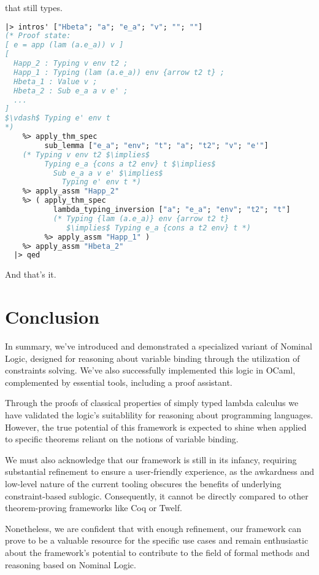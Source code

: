 \documentclass[english, mgr]{iithesis}
\newcommand{\lstt}[1]{\text{{\lstinline[columns=fixed,mathescape]|#1|}}}
\begin{document}
that \lstt{e'} still types.
\begin{lstlisting}[mathescape,language=OCaml,escapebegin=\color{codegreen}]
  |> intros' ["Hbeta"; "a"; "e_a"; "v"; ""; ""]
(* Proof state:
[ e = app (lam (a.e_a)) v ]
[
  Happ_2 : Typing v env t2 ;
  Happ_1 : Typing (lam (a.e_a)) env {arrow t2 t} ;
  Hbeta_1 : Value v ;
  Hbeta_2 : Sub e_a a v e' ;
  ...
]
$\vdash$ Typing e' env t
*)
    %> apply_thm_spec
         sub_lemma ["e_a"; "env"; "t"; "a"; "t2"; "v"; "e'"]
    (* Typing v env t2 $\implies$
         Typing e_a {cons a t2 env} t $\implies$
           Sub e_a a v e' $\implies$
             Typing e' env t *)
    %> apply_assm "Happ_2"
    %> ( apply_thm_spec
           lambda_typing_inversion ["a"; "e_a"; "env"; "t2"; "t"]
           (* Typing {lam (a.e_a)} env {arrow t2 t}
              $\implies$ Typing e_a {cons a t2 env} t *)
         %> apply_assm "Happ_1" )
    %> apply_assm "Hbeta_2"
  |> qed
\end{lstlisting}
And that's it.
\chapter{Conclusion}

In summary, we've introduced and demonstrated a specialized variant of Nominal Logic,
designed for reasoning about variable binding
through the utilization of constraints solving.
We've also successfully implemented this logic in OCaml,
complemented by essential tools, including a proof assistant.

Through the proofs of classical properties of simply typed lambda calculus
we have validated the logic's suitablility for reasoning about programming languages.
However, the true potential of this framework is expected to shine when applied to
specific theorems reliant on the notions of variable binding.

We must also acknowledge that our framework is still in its infancy,
requiring substantial refinement to ensure a user-friendly experience, as the
awkardness and low-level nature of the current tooling obscures the benefits
of underlying constraint-based sublogic.
Consequently, it cannot be directly compared to other theorem-proving frameworks
like Coq or Twelf.

Nonetheless, we are confident that with enough refinement,
our framework can prove to be a valuable resource for the specific use cases and
remain enthusiastic about the framework's potential to
contribute to the field of formal methods and reasoning based on Nominal Logic.
\end{document}
